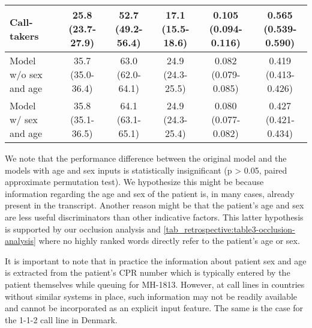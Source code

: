 {\begin{table}
{\begin{tabular}{l|ccccc}
        Call-takers                             & \makecell[c]{25.8 \\ (23.7-27.9)} & \makecell[c]{52.7 \\ (49.2-56.4)} & \makecell[c]{17.1 \\ (15.5-18.6)} & \makecell[c]{0.105 \\ (0.094-0.116)} & \makecell[c]{0.565 \\ (0.539-0.590)} \\
        \midrule
        \makecell[l]{Model \\ w/o sex and age}  & \makecell[c]{35.7 \\ (35.0-36.4)} & \makecell[c]{63.0 \\ (62.0-64.1)} & \makecell[c]{24.9 \\ (24.3-25.5)} & \makecell[c]{0.082 \\ (0.079-0.085)} & \makecell[c]{0.419 \\ (0.413-0.426)} \\
        \midrule
        \makecell[l]{Model \\ w/ sex and age}   & \makecell[c]{35.8 \\ (35.1-36.5)} & \makecell[c]{64.1 \\ (63.1-65.1)} & \makecell[c]{24.9 \\ (24.3-25.4)} & \makecell[c]{0.080 \\ (0.077-0.082)} & \makecell[c]{0.427 \\ (0.421-0.434)} \\
 
        \bottomrule
    \end{tabular}%
    }
\end{table}

We note that the performance difference between the original model and the models with age and sex inputs is statistically insignificant (p > 0.05, paired approximate permutation test). We hypothesize this might be because information regarding the age and sex of the patient is, in many cases, already present in the transcript. Another reason might be that the patient's age and sex are less useful discriminators than other indicative factors. This latter hypothesis is supported by our occlusion analysis and \cref{tab_retrospective:table3-occlusion-analysis} where no highly ranked words directly refer to the patient's age or sex. 

It is important to note that in practice the information about patient sex and age is extracted from the patient's CPR number which is typically entered by the patient themselves while queuing for MH-1813. However, at call lines in countries without similar systems in place, such information may not be readily available and cannot be incorporated as an explicit input feature. The same is the case for the 1-1-2 call line in Denmark.


}
